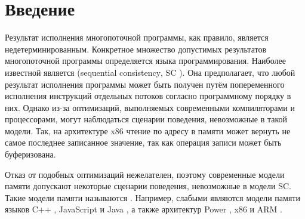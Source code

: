 \section{Введение}

Результат исполнения многопоточной программы, как правило, является недетерминированным. Конкретное множество допустимых результатов многопоточной программы определяется  языка программирования. Наиболее известной является    (\foreignlanguage{english}{sequential consistency}, SC \cite{sc}). Она предполагает, что любой результат исполнения программы может быть получен путём попеременного исполнения инструкций отдельных потоков согласно программному порядку в них. Однако из-за оптимизаций, выполняемых современными компиляторами и процессорами, могут наблюдаться сценарии поведения, невозможные в такой модели. Так, на архитектуре x86 чтение по адресу в памяти может вернуть не самое последнее записанное значение, так как операция записи может быть буферизована. 

Отказ от подобных оптимизаций нежелателен, поэтому современные модели памяти допускают некоторые сценарии поведения, невозможные в модели SC. Такие модели памяти называются . Например, слабыми являются модели памяти языков C++ \cite{cpp}, JavaScript \cite{js-mm} и Java \cite{jmm}, а также архитектур Power \cite{power}, x86 \cite{x86} и ARM \cite{arm}.



